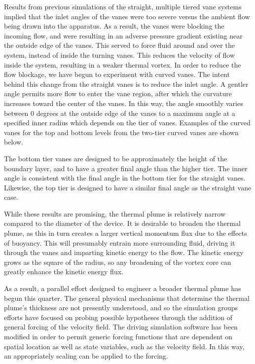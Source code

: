Results from previous simulations of the straight, multiple tiered vane
systems implied that the inlet angles of the vanes were too severe
versus the ambient flow being drawn into the  apparatus. As a result,
the vanes were blocking the incoming flow, and were resulting in an
adverse pressure gradient existing near the outside edge of the
vanes. This served to force fluid  around and over the system, instead
of inside the turning vanes. This reduces the velocity of flow  inside
the system, resulting in a weaker thermal vortex.  In order to reduce
the flow blockage, we have begun to experiment with curved vanes. The
intent behind this change from the straight vanes is to reduce the inlet
angle. A gentler angle  permits more flow to enter the vane region,
after which the curvature increases toward the center of the vanes. In
this way, the angle smoothly varies between 0 degrees at the outside
edge of the vanes to a maximum angle at a specified inner radius which
depends on the tier of vanes.  Examples of the curved vanes for the top
and bottom levels from the two-tier curved vanes are shown below.  

The bottom tier vanes are designed to be approximately the height of the
boundary layer, and to have a greater final angle than the higher
tier. The inner angle is consistent with the final angle in the bottom
tier for the straight vanes. Likewise, the top tier is designed to have
a similar final angle as the straight vane case.

While these results are promising, the thermal plume is relatively
narrow compared to the diameter of the device. It is desirable to
broaden the thermal plume, as this in turn creates a larger vertical
momentum flux due to the effects of buoyancy. This will presumably
entrain more  surrounding fluid, driving it through the vanes and
imparting kinetic energy to the flow. The kinetic energy grows as the
square of the radius, so any broadening of the vortex core can greatly
enhance the kinetic energy flux.  

As a result, a parallel effort designed to engineer a broader thermal
plume has begun this quarter. The general physical mechanisms that
determine the thermal plume's thickness are not  presently understood,
and so the simulation groups efforts have focused on probing possible
hypotheses through the addition of general forcing of the velocity
field. The driving simulation  software has been modified in order to
permit generic forcing functions that are dependent on spatial location
as well as state variables, such as the velocity field. In this way, an
appropriately  scaling can be applied to the forcing. 

